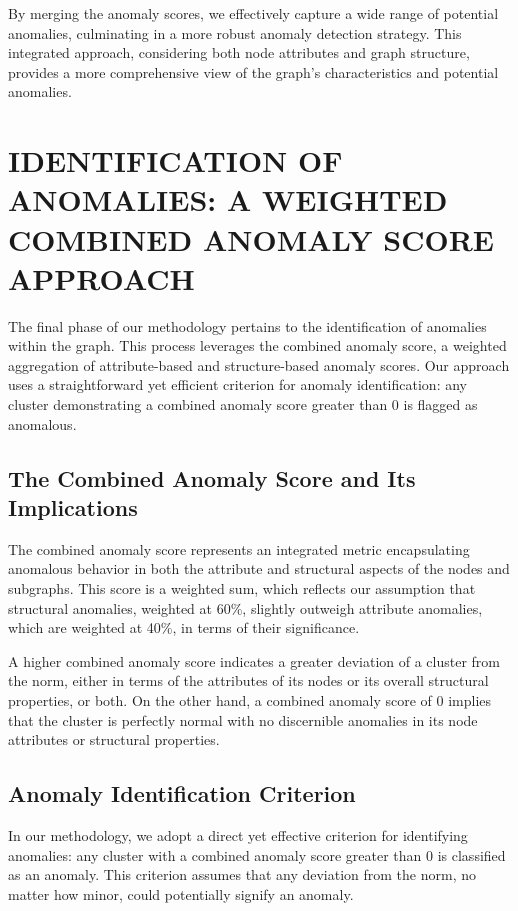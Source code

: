 \documentclass[10pt,twocolumn,a4paper]{article}
\begin{document}
By merging the anomaly scores, we effectively capture a wide range of potential anomalies, culminating in a more robust anomaly detection strategy. This integrated approach, considering both node attributes and graph structure, provides a more comprehensive view of the graph's characteristics and potential anomalies.

\section{IDENTIFICATION OF ANOMALIES: A WEIGHTED COMBINED ANOMALY SCORE APPROACH}
The final phase of our methodology pertains to the identification of anomalies within the graph. This process leverages the combined anomaly score, a weighted aggregation of attribute-based and structure-based anomaly scores. Our approach uses a straightforward yet efficient criterion for anomaly identification: any cluster demonstrating a combined anomaly score greater than 0 is flagged as anomalous.

\subsection{The Combined Anomaly Score and Its Implications}
The combined anomaly score represents an integrated metric encapsulating anomalous behavior in both the attribute and structural aspects of the nodes and subgraphs. This score is a weighted sum, which reflects our assumption that structural anomalies, weighted at 60\%, slightly outweigh attribute anomalies, which are weighted at 40\%, in terms of their significance.

A higher combined anomaly score indicates a greater deviation of a cluster from the norm, either in terms of the attributes of its nodes or its overall structural properties, or both. On the other hand, a combined anomaly score of 0 implies that the cluster is perfectly normal with no discernible anomalies in its node attributes or structural properties.

\subsection{Anomaly Identification Criterion}
In our methodology, we adopt a direct yet effective criterion for identifying anomalies: any cluster with a combined anomaly score greater than 0 is classified as an anomaly. This criterion assumes that any deviation from the norm, no matter how minor, could potentially signify an anomaly.
\end{document}

